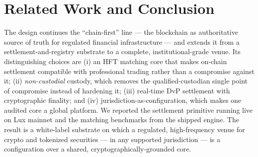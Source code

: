 \documentclass[11pt,a4paper]{article}
\begin{document}
\section{Related Work and Conclusion}

The design continues the ``chain-first'' line --- the blockchain as
authoritative source of truth for regulated financial infrastructure --- and
extends it from a settlement-and-registry substrate to a complete,
institutional-grade venue. Its distinguishing choices are (i) an HFT matching
core that makes on-chain settlement compatible with professional trading
rather than a compromise against it; (ii) \emph{non-custodial} custody, which
removes the qualified-custodian single point of compromise instead of
hardening it; (iii) real-time DvP settlement with cryptographic finality; and
(iv) jurisdiction-as-configuration, which makes one audited core a global
platform. We reported the settlement primitive running live on Lux mainnet and
the matching benchmarks from the shipped engine. The result is a white-label
substrate on which a regulated, high-frequency venue for crypto and tokenized
securities --- in any supported jurisdiction --- is a configuration over a
shared, cryptographically-grounded core.
\end{document}
